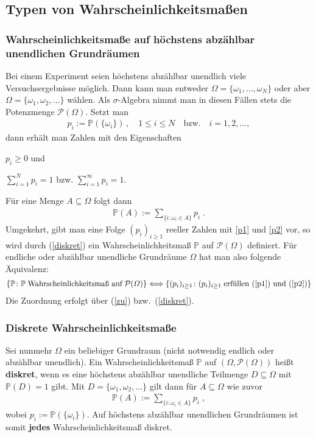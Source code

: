 \documentclass[ngerman,draft,parskip=half,twoside]{scrartcl}
\newcommand*{\PotM}{\mathcal{P}}    %
\newcommand*{\WKM}{\mathbb{P}}      %
\begin{document}
\subsection{Typen von Wahrscheinlichkeitsmaßen}
\subsubsection{Wahrscheinlichkeitsmaße auf höchstens abzählbar unendlichen Grundräumen}
Bei einem Experiment seien höchstens abzählbar unendlich viele Versuchsergebnisse
möglich. Dann kann man entweder $\Omega=\{\omega_1,\ldots,\omega_N\}$ oder
aber $\Omega=\{\omega_1,\omega_2,\ldots\}$ wählen. Als $\sigma$-Algebra nimmt man in diesen
Fällen stets die Potenzmenge $\PotM(\Omega)$. Setzt man
\begin{gather}
\label{zu}
p_i :=\WKM(\{\omega_i\})\,,\quad 1\le i\le N\quad\mbox{bzw.}\quad i=1,2,\ldots,
\end{gather}
dann erhält man Zahlen mit den Eigenschaften
\begin{eigenschaften}
 \item $p_i\ge 0$ und
  \label{p1}
 \item $\sum_{i=1}^N p_i =1$ bzw. $\sum_{i=1}^\infty p_i =1$.
  \label{p2}
\end{eigenschaften}
Für eine Menge $A\subseteq \Omega$ folgt dann
\begin{gather}
\label{diskret}
\WKM(A):= \sum_{\{i\colon \omega_i\in A\}} p_i\;.
\end{gather}
Umgekehrt, gibt man eine Folge $(p_i)_{i\ge 1}$ reeller Zahlen mit \ref{p1} und \ref{p2} vor,
so wird durch (\ref{diskret}) ein Wahrscheinlichkeitsmaß $\WKM$ auf $\PotM(\Omega)$ definiert. Für
endliche oder abzählbar unendliche Grundräume $\Omega$ hat man also folgende Äquivalenz:
\begin{gather*}
  \{\WKM\colon \WKM\;\mbox{Wahrscheinlichkeitsmaß auf}\;\PotM(\Omega)\}
     \Longleftrightarrow\{(p_i)_{i\ge 1}\colon (p_i)_{i\ge 1}\;\mbox{erfüllen (\ref{p1}) und (\ref{p2})}\}
\end{gather*}
Die Zuordnung erfolgt über (\ref{zu}) bzw.~(\ref{diskret}).

\subsubsection{Diskrete Wahrscheinlichkeitsmaße}
Sei nunmehr $\Omega$ ein beliebiger Grundraum (nicht notwendig endlich
oder abzählbar unendlich). Ein Wahrscheinlichkeitsmaß $\WKM$ auf $(\Omega,\PotM(\Omega))$
heißt \textbf{diskret}, wenn es eine höchstens abzählbar unendliche Teilmenge $D\subseteq \Omega$
mit $\WKM(D)=1$ gibt. Mit $D=\{\omega_1,\omega_2,\ldots\}$ gilt dann für $A\subseteq \Omega$ wie zuvor
\begin{gather*}
  \WKM(A):= \sum_{\{i\colon \omega_i\in A\}} p_i\;,
\end{gather*}
wobei $p_i:=\WKM(\{\omega_i\})$. Auf höchstens abzählbar unendlichen Grundräumen ist somit \textbf{jedes}
Wahrscheinlichkeitsmaß diskret.
\end{document}
